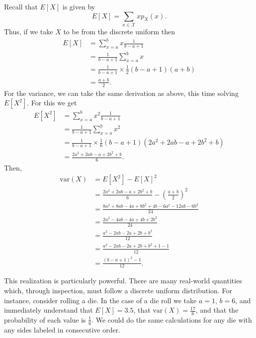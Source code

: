 \documentclass[
  letterpaper,
  DIV=11,
  numbers=noendperiod]{scrreprt}
\theoremstyle{definition}
\theoremstyle{definition}
\theoremstyle{definition}
\theoremstyle{remark}
\begin{document}
\begin{tcolorbox}[enhanced jigsaw, coltitle=black, colframe=quarto-callout-warning-color-frame, colbacktitle=quarto-callout-warning-color!10!white, bottomrule=.15mm, opacitybacktitle=0.6, colback=white, toptitle=1mm, arc=.35mm, leftrule=.75mm, bottomtitle=1mm, opacityback=0, breakable, rightrule=.15mm, title={Mean and Variance of Discrete Uniform}, left=2mm, titlerule=0mm, toprule=.15mm]

Recall that \(E[X]\) is given by
\[E[X] = \sum_{x\in\mathcal{X}} xp_X(x).\] Thus, if we take \(X\) to be
from the discrete uniform then \begin{align*}
E[X] &= \sum_{x=a}^b x\frac{1}{b-a+1} \\
&= \frac{1}{b-a+1}\sum_{x=a}^b x \\
&= \frac{1}{b-a+1}\times\frac{1}{2}(b-a+1)(a+b) \\
&= \frac{a+b}{2}.
\end{align*} For the variance, we can take the same derivation as above,
this time solving \(E[X^2]\). For this we get \begin{align*}
E[X^2] &= \sum_{x=a}^b x^2\frac{1}{b-a+1} \\
&= \frac{1}{b-a+1}\sum_{x=a}^b x^2 \\
&= \frac{1}{b-a+1}\times\frac{1}{6}(b-a+1)(2a^2 + 2ab - a + 2b^2 + b) \\
&= \frac{2a^2 + 2ab - a + 2b^2 + b}{6}.
\end{align*} Then, \begin{align*}
\text{var}(X) &= E[X^2] - E[X]^2 \\
&= \frac{2a^2 + 2ab - a + 2b^2 + b}{6} - \left(\frac{a+b}{2}\right)^2 \\
&= \frac{8a^2 + 8ab - 4a + 8b^2 + 4b - 6a^2 - 12ab - 6b^2}{24} \\
&= \frac{2a^2 - 4ab - 4a + 4b + 2b^2}{24} \\
&= \frac{a^2 - 2ab - 2a + 2b + b^2}{12} \\
&= \frac{a^2 - 2ab - 2a + 2b + b^2 + 1 - 1}{12} \\
&= \frac{(b-a+1)^2 - 1}{12}.
\end{align*}

\end{tcolorbox}

This realization is particularly powerful. There are many real-world
quantities which, through inspection, must follow a discrete uniform
distribution. For instance, consider rolling a die. In the case of a die
roll we take \(a=1\), \(b=6\), and immediately understand that
\(E[X] = 3.5\), that \(\text{var}(X) = \frac{17}{6}\), and that the
probability of each value is \(\frac{1}{6}\). We could do the same
calculations for any die with any sides labeled in consecutive order.
\end{document}
